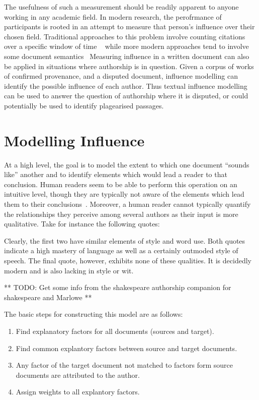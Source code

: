 \documentclass[../dissertation.tex]{subfiles}
\begin{document}
The usefulness of such a measurement should be readily apparent to
anyone working in any academic field.  In modern research, the
perofrmance of participants is rooted in an attempt to measure that
person's influence over their chosen field.  Traditional approaches to
this problem involve counting citations over a specific window of time
~\cite{adler2009} while more modern approaches tend to involve some
document semantics~\cite{dietz2007, jiang2014, **buneman**} Measuring
influence in a written document can also be applied in situations
where authorship is in question.  Given a corpus of works of confirmed
provenance, and a disputed document, influence modelling can identify
the possible influence of each author.  Thus textual influence
modelling can be used to answer the question of authorship where it is
disputed, or could potentially be used to identify plagearised
passages.


\section{Modelling Influence}
At a high level, the goal is to model the extent to which one document
``sounds like'' another and to identify elements which would lead a
reader to that conclusion.  Human readers seem to be able to perform
this operation on an intuitive level, though they are typically not
aware of the elements which lead them to their
conclusions~\cite{craig2009}.  Moreover, a human reader cannot
typically quantify the relationships they perceive among several
authors as their input is more qualitative.  Take for instance the
following quotes:


Clearly, the first two have similar elements of style and word use.
Both quotes indicate a high mastery of language as well as a certainly
outmoded style of speech.  The final quote, however, exhibits none of
these qualities.  It is decidedly modern and is also lacking in style or
wit.  


** TODO: Get some info from the shakespeare authorship companion for
shakespeare and Marlowe **

The basic steps for constructing this model are as follows:
\begin{enumerate}
    \item Find explanatory factors for all documents (sources and
        target).
    \item Find common explantory factors between source and target
        documents.  
    \item Any factor of the target document not matched to factors
        form source documents are attributed to the author.
    \item Assign weights to all explantory factors.
\end{enumerate}
\end{document}
